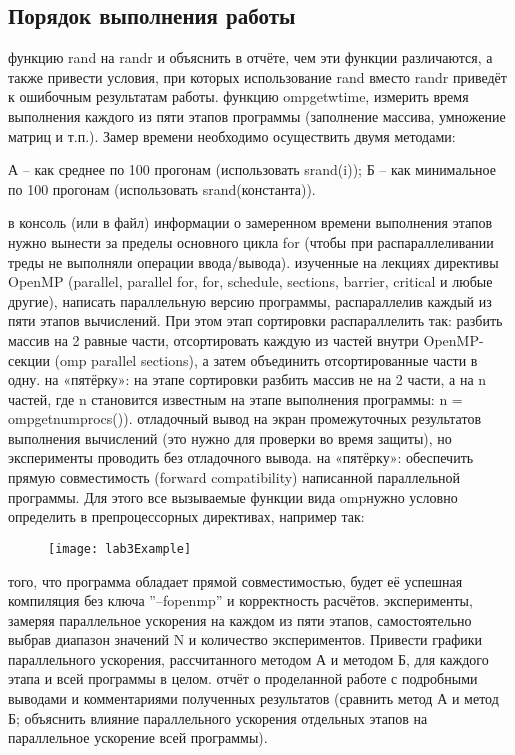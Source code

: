 { %
	\subsection{Порядок выполнения работы}
	\Large
	\begin{enumerate}
		 функцию rand на rand\textunderscore r и объяснить в отчёте, чем эти функции различаются, а также привести условия, при которых использование rand вместо rand\textunderscore r приведёт к ошибочным результатам работы. 
		 функцию omp\textunderscore get\textunderscore wtime, измерить время выполнения каждого из пяти этапов программы (заполнение массива, умножение матриц и т.п.). Замер времени необходимо осуществить двумя методами:	
			\begin{itemize}
				 А – как среднее по 100 прогонам (использовать srand(i));
				 Б – как минимальное по 100 прогонам (использовать srand(константа)).	
			\end{itemize}
		 в консоль (или в файл) информации о замеренном времени выполнения этапов нужно вынести за пределы основного цикла for (чтобы при распараллеливании треды не выполняли операции ввода/вывода).
		 изученные на лекциях директивы OpenMP (parallel, parallel for, for, schedule, sections, barrier, critical и любые другие), написать параллельную версию программы, распараллелив каждый из пяти этапов вычислений. При этом этап сортировки распараллелить так: разбить массив на 2 равные части, отсортировать каждую из частей внутри OpenMP-секции (omp parallel sections), а затем объединить отсортированные части в одну.
		 на «пятёрку»: на этапе сортировки разбить массив не на 2 части, а на n частей, где n становится известным на этапе выполнения программы: n = omp\textunderscore get\textunderscore num\textunderscore procs()). 
		 отладочный вывод на экран промежуточных результатов выполнения вычислений (это нужно для проверки во время защиты), но эксперименты проводить без отладочного вывода. 
		 на «пятёрку»: обеспечить прямую совместимость (forward compatibility) написанной параллельной программы. Для этого все вызываемые функции вида omp\textunderscore * нужно условно определить в препроцессорных директивах, например так: 	   
			\begin{figure}[H]
				\texttt{[image: lab3Example]}
			\end{figure}
		 того, что программа обладает прямой совместимостью, будет её успешная компиляция без ключа ''–fopenmp'' и корректность расчётов.
		 эксперименты, замеряя параллельное ускорения на каждом из пяти этапов, самостоятельно выбрав диапазон значений N и количество экспериментов. Привести графики параллельного ускорения, рассчитанного методом А и методом Б, для каждого этапа и всей программы в целом. 
		 отчёт о проделанной работе с подробными выводами и комментариями полученных результатов (сравнить метод А и метод Б; объяснить влияние параллельного ускорения отдельных этапов на параллельное ускорение всей программы).
	\end{enumerate}
}